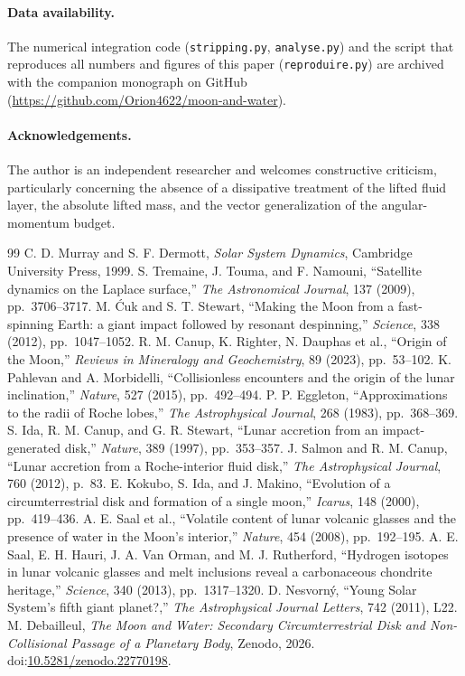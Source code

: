 \documentclass[11pt,a4paper]{article}
\begin{document}
\paragraph{Data availability.}
The numerical integration code (\texttt{stripping.py}, \texttt{analyse.py}) and the script that reproduces all numbers and figures of this paper (\texttt{reproduire.py}) are archived with the companion monograph \cite{Debailleul2026} on GitHub (\url{https://github.com/Orion4622/moon-and-water}).

\paragraph{Acknowledgements.}
The author is an independent researcher and welcomes constructive criticism, particularly concerning the absence of a dissipative treatment of the lifted fluid layer, the absolute lifted mass, and the vector generalization of the angular-momentum budget.

\begin{thebibliography}{99}
 C. D. Murray and S. F. Dermott, \emph{Solar System Dynamics}, Cambridge University Press, 1999.
 S. Tremaine, J. Touma, and F. Namouni, ``Satellite dynamics on the Laplace surface,'' \emph{The Astronomical Journal}, 137 (2009), pp.~3706--3717.
 M. \'{C}uk and S. T. Stewart, ``Making the Moon from a fast-spinning Earth: a giant impact followed by resonant despinning,'' \emph{Science}, 338 (2012), pp.~1047--1052.
 R. M. Canup, K. Righter, N. Dauphas et al., ``Origin of the Moon,'' \emph{Reviews in Mineralogy and Geochemistry}, 89 (2023), pp.~53--102.
 K. Pahlevan and A. Morbidelli, ``Collisionless encounters and the origin of the lunar inclination,'' \emph{Nature}, 527 (2015), pp.~492--494.
 P. P. Eggleton, ``Approximations to the radii of Roche lobes,'' \emph{The Astrophysical Journal}, 268 (1983), pp.~368--369.
 S. Ida, R. M. Canup, and G. R. Stewart, ``Lunar accretion from an impact-generated disk,'' \emph{Nature}, 389 (1997), pp.~353--357.
 J. Salmon and R. M. Canup, ``Lunar accretion from a Roche-interior fluid disk,'' \emph{The Astrophysical Journal}, 760 (2012), p.~83.
 E. Kokubo, S. Ida, and J. Makino, ``Evolution of a circumterrestrial disk and formation of a single moon,'' \emph{Icarus}, 148 (2000), pp.~419--436.
 A. E. Saal et al., ``Volatile content of lunar volcanic glasses and the presence of water in the Moon's interior,'' \emph{Nature}, 454 (2008), pp.~192--195.
 A. E. Saal, E. H. Hauri, J. A. Van Orman, and M. J. Rutherford, ``Hydrogen isotopes in lunar volcanic glasses and melt inclusions reveal a carbonaceous chondrite heritage,'' \emph{Science}, 340 (2013), pp.~1317--1320.
 D. Nesvorn\'y, ``Young Solar System's fifth giant planet?,'' \emph{The Astrophysical Journal Letters}, 742 (2011), L22.
 M. Debailleul, \emph{The Moon and Water: Secondary Circumterrestrial Disk and Non-Collisional Passage of a Planetary Body}, Zenodo, 2026. doi:\href{https://doi.org/10.5281/zenodo.22770198}{10.5281/zenodo.22770198}.
\end{thebibliography}
\end{document}
